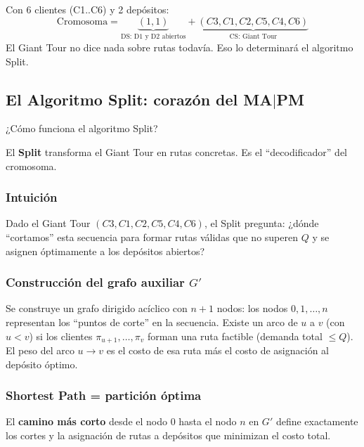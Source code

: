 \documentclass[12pt,a4paper]{article}
\begin{document}
\begin{ejemplo}
Con 6 clientes (C1..C6) y 2 depósitos:
$$\text{Cromosoma} = \underbrace{(1, 1)}_{\text{DS: D1 y D2 abiertos}} + \underbrace{(C3, C1, C2, C5, C4, C6)}_{\text{CS: Giant Tour}}$$
El Giant Tour no dice nada sobre rutas todavía. Eso lo determinará el algoritmo Split.
\end{ejemplo}

\subsection{El Algoritmo Split: corazón del MA$|$PM}

\begin{pregunta}
¿Cómo funciona el algoritmo Split?
\end{pregunta}

El \textbf{Split} transforma el Giant Tour en rutas concretas. Es el ``decodificador'' del cromosoma.

\subsubsection{Intuición}

Dado el Giant Tour $(C3, C1, C2, C5, C4, C6)$, el Split pregunta: ¿dónde ``cortamos'' esta secuencia para formar rutas válidas que no superen $Q$ y se asignen óptimamente a los depósitos abiertos?

\subsubsection{Construcción del grafo auxiliar $G'$}

Se construye un grafo dirigido acíclico con $n+1$ nodos: los nodos $0, 1, \ldots, n$ representan los ``puntos de corte'' en la secuencia. Existe un arco de $u$ a $v$ (con $u < v$) si los clientes $\pi_{u+1}, \ldots, \pi_v$ forman una ruta factible (demanda total $\leq Q$). El peso del arco $u \to v$ es el costo de esa ruta más el costo de asignación al depósito óptimo.

\subsubsection{Shortest Path = partición óptima}

El \textbf{camino más corto} desde el nodo $0$ hasta el nodo $n$ en $G'$ define exactamente los cortes y la asignación de rutas a depósitos que minimizan el costo total.
\end{document}
